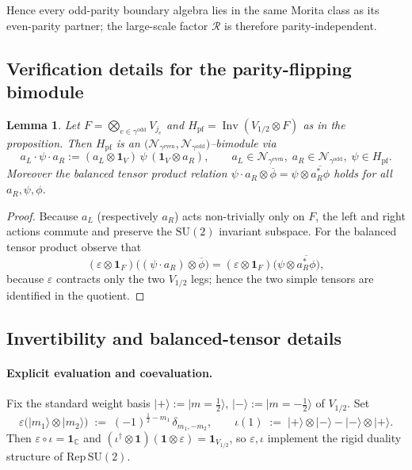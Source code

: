 \documentclass[11pt]{article}
\newtheorem{lemma}{Lemma}[section]
\begin{document}
Hence every odd-parity boundary algebra lies in the same Morita class as its
even-parity partner; the large-scale factor $\mathcal R$ is therefore
parity-independent.

\subsection*{Verification details for the parity-flipping bimodule}

\begin{lemma}\label{lem:bimodule-structure}
Let $F=\bigotimes_{e\in\gamma^{\mathrm{odd}}}V_{j_e}$ and
$H_{\mathrm{pf}}=\operatorname{Inv}(V_{1/2}\otimes F)$ as in the
proposition.
Then $H_{\mathrm{pf}}$ is an
$\bigl(\mathcal N_{\gamma^{\mathrm{even}}},
       \mathcal N_{\gamma^{\mathrm{odd}}}\bigr)$–bimodule via
\[
  a_L\cdot\psi\cdot a_R
  :=(a_L\otimes\mathbf1_V)\,\psi\,(\mathbf1_V\otimes a_R),
  \qquad
  a_L\in\mathcal N_{\gamma^{\mathrm{even}}},
  \;a_R\in\mathcal N_{\gamma^{\mathrm{odd}}},
  \;\psi\in H_{\mathrm{pf}}.
\]
Moreover the balanced tensor product relation
$\psi\cdot a_R\otimes\overline\phi
  =\psi\otimes\overline{a_R^{*}\phi}$
holds for all $a_R,\psi,\phi$.
\end{lemma}

\begin{proof}
Because $a_L$ (respectively $a_R$) acts non-trivially only on $F$,
the left and right actions commute and preserve the $\mathrm{SU}(2)$
invariant subspace.  For the balanced tensor product observe that
\[
  (\varepsilon\!\otimes\!\mathbf1_F)
   \bigl((\psi\cdot a_R)\otimes\overline\phi\bigr)
  =(\varepsilon\!\otimes\!\mathbf1_F)
   \bigl(\psi\otimes\overline{a_R^{*}\phi}\bigr),
\]
because $\varepsilon$ contracts only the two $V_{1/2}$ legs; hence the
two simple tensors are identified in the quotient.
\end{proof}

\subsection*{Invertibility and balanced-tensor details}

\paragraph{Explicit evaluation and coevaluation.}
Fix the standard weight basis
$|+\rangle:=|m=\tfrac12\rangle$, $|-\rangle:=|m=-\tfrac12\rangle$ of
$V_{1/2}$.
Set
\[
  \varepsilon\bigl(|m_1\rangle\!\otimes|m_2\rangle\bigr)
  \;:=\;
  (-1)^{\tfrac12-m_1}\,\delta_{m_1,-m_2},
  \qquad
  \iota(1)
  \;:=\;
  |+\rangle\!\otimes|-\rangle-|-\rangle\!\otimes|+\rangle.
\]
Then $\varepsilon\circ\iota=\mathbf1_{\mathbb C}$ and
$(\iota^\dagger\!\otimes\!\mathbf1)(\mathbf1\!\otimes\!\varepsilon)
   =\mathbf1_{V_{1/2}}$, so $\varepsilon,\iota$ implement the rigid duality
structure of $\mathrm{Rep}\,\mathrm{SU}(2)$.
\end{document}
